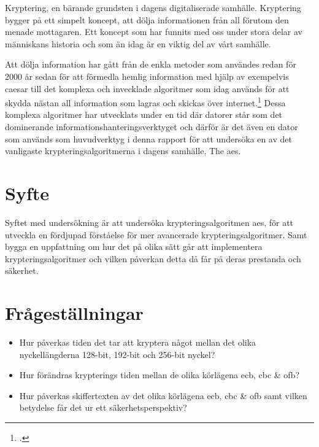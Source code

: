 Kryptering, en bärande grundsten i dagens digitaliserade samhälle. Kryptering bygger på ett simpelt koncept, att dölja informationen
från all förutom den menade mottagaren. Ett koncept som har funnits med oss under stora delar av
människans historia och som än idag är en viktig del av vårt samhälle.

Att dölja information har gått från de enkla metoder som användes redan för 2000 år sedan för att förmedla hemlig information med hjälp av
exempelvis \gls{caesar} till det komplexa och invecklade algoritmer som idag används för att skydda nästan all information som lagras och skickas
över internet.\footcite{luciano1987cryptology} Dessa komplexa algoritmer har utvecklats under en tid där datorer står som det dominerande informationshanteringsverktyget och
därför är det även en dator som används som huvudverktyg i denna rapport för att undersöka en av det vanligaste krypteringsalgoritmerna i dagens samhälle,
The \acrfull{aes}.

\section{Syfte} %
Syftet med undersökning är att undersöka krypteringsalgoritmen \acrshort{aes},
för att utveckla en fördjupad förståelse för mer avancerade krypteringsalgoritmer.
Samt bygga en uppfattning om hur det på olika sätt går att implementera krypteringsalgoritmer
och vilken påverkan detta då får på deras prestanda och säkerhet.

\section{Frågeställningar} %
\begin{itemize}
    \setlength{\itemindent}{-1em}
    \item Hur påverkas tiden det tar att kryptera något mellan det olika nyckellängderna 128-bit,
          192-bit och 256-bit nyckel?

    \item Hur förändras krypterings tiden mellan de olika körlägena \acrshort{ecb}, \acrshort{cbc} \& \acrshort{ofb}?

    \item Hur påverkas skiffertexten av det olika körlägena \acrshort{ecb}, \acrshort{cbc} \& \acrshort{ofb}
          samt vilken betydelse får det ur ett säkerhetsperspektiv?
\end{itemize}

